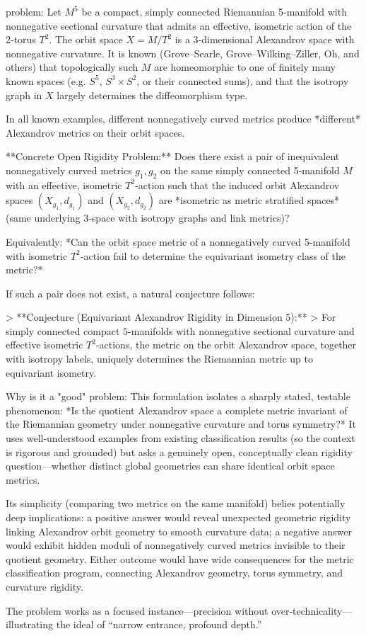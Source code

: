 problem:  
Let \(M^5\) be a compact, simply connected Riemannian 5‑manifold with nonnegative sectional curvature that admits an effective, isometric action of the 2‑torus \(T^2\). The orbit space \(X=M/T^2\) is a 3‑dimensional Alexandrov space with nonnegative curvature. It is known (Grove–Searle, Grove–Wilking–Ziller, Oh, and others) that topologically such \(M\) are homeomorphic to one of finitely many known spaces (e.g. \(S^5\), \(S^3\times S^2\), or their connected sums), and that the isotropy graph in \(X\) largely determines the diffeomorphism type.  

In all known examples, different nonnegatively curved metrics produce *different* Alexandrov metrics on their orbit spaces.  

**Concrete Open Rigidity Problem:**  
Does there exist a pair of inequivalent nonnegatively curved metrics \(g_1, g_2\) on the same simply connected 5‑manifold \(M\) with an effective, isometric \(T^2\)-action such that the induced orbit Alexandrov spaces \((X_{g_1},d_{g_1})\) and \((X_{g_2},d_{g_2})\) are *isometric as metric stratified spaces* (same underlying 3‑space with isotropy graphs and link metrics)?  

Equivalently:  
*Can the orbit space metric of a nonnegatively curved 5‑manifold with isometric \(T^2\)‑action fail to determine the equivariant isometry class of the metric?*  

If such a pair does not exist, a natural conjecture follows:  

> **Conjecture (Equivariant Alexandrov Rigidity in Dimension 5):**  
> For simply connected compact \(5\)-manifolds with nonnegative sectional curvature and effective isometric \(T^2\)-actions, the metric on the orbit Alexandrov space, together with isotropy labels, uniquely determines the Riemannian metric up to equivariant isometry.

Why is it a "good" problem:  
This formulation isolates a sharply stated, testable phenomenon: *Is the quotient Alexandrov space a complete metric invariant of the Riemannian geometry under nonnegative curvature and torus symmetry?* It uses well‑understood examples from existing classification results (so the context is rigorous and grounded) but asks a genuinely open, conceptually clean rigidity question—whether distinct global geometries can share identical orbit space metrics.  

Its simplicity (comparing two metrics on the same manifold) belies potentially deep implications: a positive answer would reveal unexpected geometric rigidity linking Alexandrov orbit geometry to smooth curvature data; a negative answer would exhibit hidden moduli of nonnegatively curved metrics invisible to their quotient geometry. Either outcome would have wide consequences for the metric classification program, connecting Alexandrov geometry, torus symmetry, and curvature rigidity.  

The problem works as a focused instance—precision without over‑technicality—illustrating the ideal of “narrow entrance, profound depth.”